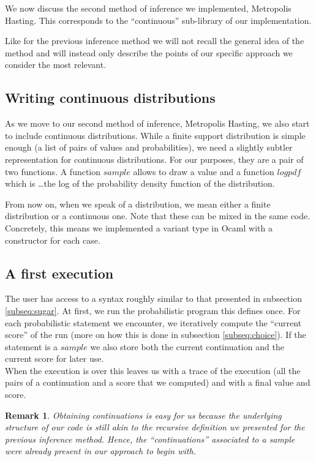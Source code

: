 \documentclass{article}
\newtheorem{remark}{Remark}
\begin{document}
	We now discuss the second method of inference we implemented, Metropolis Hasting.
	This corresponds to the ``continuous'' sub-library of our implementation.
	
	Like for the previous inference method we will not recall the general idea of the method and will instead only describe the points of our specific approach we consider the most relevant.

	\subsection{Writing continuous distributions}

	As we move to our second method of inference, Metropolis Hasting, we also start to include continuous distributions.
	While a finite support distribution is simple enough (a list of pairs of values and probabilities), we need a slightly subtler representation for continuous distributions.
	For our purposes, they are a pair of two functions. A function $sample$ allows to draw a value and a function $logpdf$ which is \dots the log of the probability density function of the distribution.

	From now on, when we speak of a distribution, we mean either a finite distribution or a continuous one. Note that these can be mixed in the same code.
	Concretely, this means we implemented a variant type in Ocaml with a constructor for each case.

	\subsection{A first execution}

	The user has access to a syntax roughly similar to that presented in subsection \ref{subseq:sugar}.
	At first, we run the probabilistic program this defines once.
	For each probabilistic statement we encounter, we iteratively compute the ``current score'' of the run (more on how this is done in subsection \ref{subseq:choice}).
	If the statement is a $sample$ we also store both the current continuation and the current score for later use. \\

	When the execution is over this leaves us with a trace of the execution (all the pairs of a continuation and a score that we computed) and with a final value and score. 

	\begin{remark}
	  Obtaining continuations is easy for us because the underlying structure of our code is still akin to the recursive definition we presented for the previous inference method.
	  Hence, the ``continuations'' associated to a sample were already present in our approach to begin with.
	\end{remark}
\end{document}
